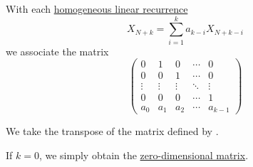 \begin{definition}\label{def:homogeneous_linear_recurrence_matrix}\mimprovised
  With each \hyperref[def:homogeneous_linear_recurrence]{homogeneous linear recurrence}
  \begin{equation*}
    X_{N+k} = \sum_{i=1}^k a_{k-i} X_{N+k-i}
  \end{equation*}
  we associate the matrix
  \begin{equation}\label{eq:def:homogeneous_linear_recurrence}
    \begin{pmatrix}
      0      & 1      & 0      & \cdots & 0      \\
      0      & 0      & 1      & \cdots & 0      \\
      \vdots & \vdots & \vdots & \ddots & \vdots \\
      0      & 0      & 0      & \cdots & 1      \\
      a_0    & a_1    & a_2    & \cdots & a_{k-1}
    \end{pmatrix}
  \end{equation}
\end{definition}
\begin{comments}
  \item We take the transpose of the matrix defined by \textcite[401]{LidlNiederreiter1997FiniteFields}.
  \item If \( k = 0 \), we simply obtain the \hyperref[ex:def:array/zero_dimensional]{zero-dimensional matrix}.
\end{comments}

